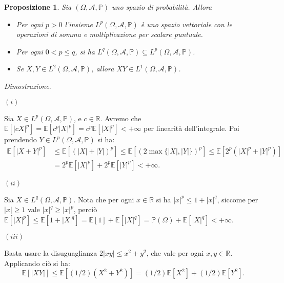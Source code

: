 \documentclass[11pt]{book}
\makeatletter
\theoremstyle{Definizione}
\theoremstyle{TeoremaProposizioneLemmaCorollario}
\newtheorem{mypropo}[myteo]{Proposizione}
\theoremstyle{OsservazioneNota}
\renewenvironment{proof}[1][\proofname]{\par
  \normalfont \topsep6\p@\@plus6\p@\relax
  \trivlist
  \item[\hskip\labelsep
        \itshape
    #1\@addpunct{.}]\ignorespaces
}{%
  \endtrivlist\@endpefalse
}
\newcommand{\R}{\mathbb{R}}
\renewcommand{\P}{\mathbb{P}}
\newcommand{\E}{\mathbb{E}}
\renewenvironment{proof}{\textsl{Dimostrazione}.}{}
\makeatother
\begin{document}
\begin{boxpro}
\begin{mypropo}\label{pro:ProprietàSpaziLp}
Sia $(\Omega,\mathcal{A},\P)$ uno spazio di probabilità. Allora
\begin{itemize}
\item[$(i)$] Per ogni $p > 0$ l'insieme $L^p(\Omega,\mathcal{A},\P)$ è uno spazio vettoriale con le operazioni di somma e moltiplicazione per scalare puntuale.
\item[$(ii)$] Per ogni $0 < p \leq q$, si ha $L^q(\Omega,\mathcal{A},\P) \subseteq L^p(\Omega,\mathcal{A},\P)$.
\item[$(iii)$] Se $X,Y\in L^2(\Omega,\mathcal{A},\P)$, allora $XY\in L^1(\Omega,\mathcal{A},\P)$.
\end{itemize}
\end{mypropo}
\tcblower
\begin{proof}
\hfill
\begin{flushleft}
$(i)$
\end{flushleft}
Sia $X\in L^p(\Omega,\mathcal{A},\P)$, e $c\in \R$. Avremo che $\E[|cX|^p] = \E[c^p|X|^p] = c^p\E[|X|^p] < +\infty$ per linearità dell'integrale. Poi prendendo $Y\in L^p(\Omega,\mathcal{A},\P)$ si ha:
\begin{align*}
\E[|X+Y|^p] &\leq \E[(|X|+|Y|)^p ]\leq \E[(2\max\{|X|,|Y|\})^p ]\leq \E[2^p(|X|^p+|Y|^p)] \\
&= 2^p\E[|X|^p]+2^p\E[|Y|^p] <+\infty.
\end{align*}
\begin{flushleft}
$(ii)$
\end{flushleft}
Sia $X\in L^q(\Omega,\mathcal{A},\P)$. Nota che per ogni $x\in \R$ si ha $|x|^p \leq 1+ |x|^q$, siccome per $|x| \geq 1$ vale $|x|^q \geq |x|^p$, perciò $\E[|X|^p] \leq \E[1+|X|^q] = \E[1] + \E[|X|^q] = \P(\Omega) + \E[|X|^q] < +\infty$.
\begin{flushleft}
$(iii)$
\end{flushleft}
Basta usare la disuguaglianza $2|xy| \leq x^2+y^2$, che vale per ogni $x,y\in \R$. Applicando ciò si ha:
$$
\E[|XY|] \leq \E[(1/2)(X^2+Y^2)] = (1/2) \E[X^2]+ (1/2)\E[Y^2].
$$
\end{proof}
\end{boxpro}
\end{document}
